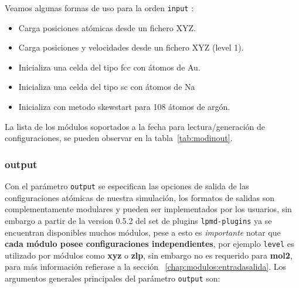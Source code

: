 Veamos algunas formas de uso para la orden \verb|input| :

\begin{itemize}
\item Carga posiciones at\'omicas desde un fichero XYZ.
\item Carga posiciones y velocidades desde un fichero XYZ (level 1).
\item Inicializa una celda del tipo fcc con átomos de Au.
\item Inicializa una celda del tipo sc con átomos de Na
\item Inicializa con metodo skewstart para 108 \'atomos de arg\'on.
\end{itemize}

La lista de los m\'odulos soportados a la fecha para lectura/generaci\'on de configuraciones, se pueden observar en la tabla~\ref{tab:modinout}.

\subsubsection{output}

Con el par\'ametro \verb|output| se especifican las opciones de salida de las configuraciones at\'omicas de nuestra simulaci\'on, los formatos de salidas son complementamente modulares y pueden ser implementados por los usuarios, sin embargo a partir de la version 0.5.2 del set de plugins \verb|lpmd-plugins| ya se encuentran disponibles muchos m\'odulos, pese a esto es \textit{importante} notar que \textbf{cada m\'odulo posee configuraciones independientes}, por ejemplo \verb|level| es utilizado por m\'odulos como \textbf{xyz} o \textbf{zlp}, sin embargo no es requerido para \textbf{mol2}, para m\'as informaci\'on refierase a la secci\'on ~\ref{chap:modulos:entradasalida}. Los argumentos generales principales del par\'ametro \verb|output| son:


